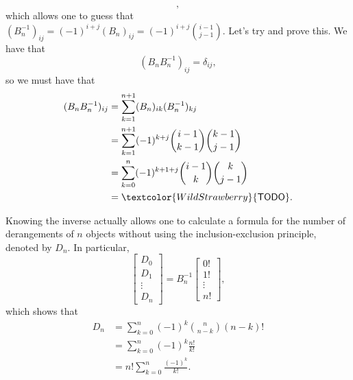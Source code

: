 \documentclass[a4paper, 12pt]{article}
\begin{document}
\begin{idea}
\[    ,\]
    which allows one to guess that \( (B_n^{-1})_{ij} = (-1)^{i + j} (B_n)_{ij} = (-1)^{i + j} \binom{i - 1}{j - 1} \). Let's try and prove this. We have that
    \[
        (B_n B_n^{-1})_{ij} = \delta_{ij}
    ,\]
    so we must have that
    \begin{align*}
        (B_n B_n^{-1})_{ij} &= \sum_{k = 1}^{n+1} (B_n)_{ik} (B_n^{-1})_{kj} \\
        &= \sum_{k = 1}^{n + 1} (-1)^{k + j} \binom{i - 1}{k - 1} \binom{k - 1}{j - 1} \\
        &= \sum_{k = 0}^{n} (-1)^{k + 1 + j} \binom{i - 1}{k} \binom{k}{j - 1}  \\
        &= \textcolor{WildStrawberry}{\textsf{TODO}}
    .\end{align*}
\end{idea}

\begin{remark}
    Knowing the inverse actually allows one to calculate a formula for the number of derangements of \( n \) objects without using the inclusion-exclusion principle, denoted by \( D_n \). In particular,
    \[
        \begin{bmatrix}
            D_0 \\
            D_1 \\
            \vdots \\
            D_{n}
        \end{bmatrix} =
        B_{n}^{-1} \begin{bmatrix}
            0! \\
            1! \\
            \vdots \\
            n!
        \end{bmatrix}
    ,\]
    which shows that
    \begin{align*}
        D_n &= \sum_{k = 0}^{n} (-1)^k \binom{n}{n - k} (n-k)! \\
        &= \sum_{k = 0}^{n} (-1)^k \frac{n!}{k!} \\
        &= n! \sum_{k = 0}^{n} \frac{(-1)^k}{k!}
    .\end{align*}
\end{remark}
\end{document}
